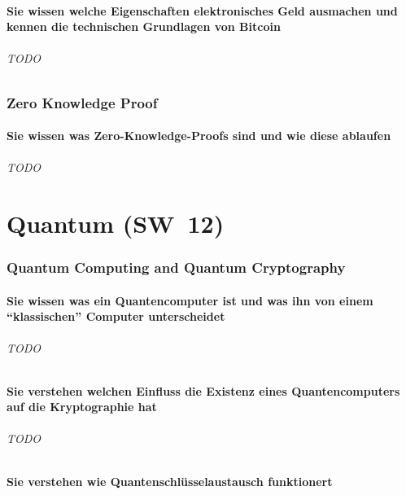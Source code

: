 \documentclass[10pt,a4paper]{article}
\begin{document}
\subsection*{Sie wissen welche Eigenschaften elektronisches Geld ausmachen und kennen die technischen Grundlagen von Bitcoin}
\paragraph*{TODO}

\section{Zero Knowledge Proof}
\subsection*{Sie wissen was Zero-Knowledge-Proofs sind und wie diese ablaufen}
\paragraph*{TODO}


\part{Quantum (SW~12)}
\section{Quantum Computing and Quantum Cryptography}
\subsection*{Sie wissen was ein Quantencomputer ist und was ihn von einem "`klassischen"' Computer unterscheidet}
\paragraph*{TODO}

\subsection*{Sie verstehen welchen Einfluss die Existenz eines Quantencomputers auf die Kryptographie hat}
\paragraph*{TODO}

\subsection*{Sie verstehen wie Quantenschlüsselaustausch funktionert}
\end{document}
